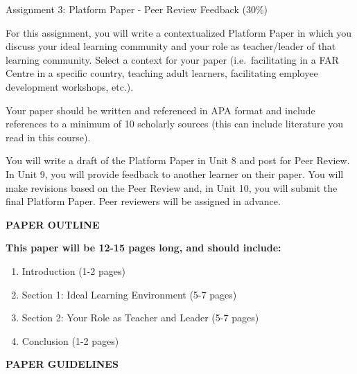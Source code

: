 \documentclass[
]{book}
\providecommand{\tightlist}{%
  \setlength{\itemsep}{0pt}\setlength{\parskip}{0pt}}
\begin{document}
\begin{assessment}
{Assignment 3: Platform Paper - Peer Review Feedback (30\%)}

For this assignment, you will write a contextualized Platform Paper in
which you discuss your ideal learning community and your role as
teacher/leader of that learning community. Select a context for your
paper (i.e.~facilitating in a FAR Centre in a specific country, teaching
adult learners, facilitating employee development workshops, etc.).

Your paper should be written and referenced in APA format and include
references to a minimum of 10 scholarly sources (this can include
literature you read in this course).

You will write a draft of the Platform Paper in Unit 8 and post for Peer
Review. In Unit 9, you will provide feedback to another learner on their
paper. You will make revisions based on the Peer Review and, in Unit 10,
you will submit the final Platform Paper. Peer reviewers will be
assigned in advance.

\textbf{PAPER OUTLINE}

\textbf{This paper will be 12-15 pages long, and should include:}

\begin{enumerate}
\def\labelenumi{\arabic{enumi}.}
\tightlist
\item
  Introduction (1-2 pages)\\
\item
  Section 1: Ideal Learning Environment (5-7 pages)\\
\item
  Section 2: Your Role as Teacher and Leader (5-7 pages)\\
\item
  Conclusion (1-2 pages)
\end{enumerate}

\textbf{PAPER GUIDELINES}


\end{assessment}
\end{document}
